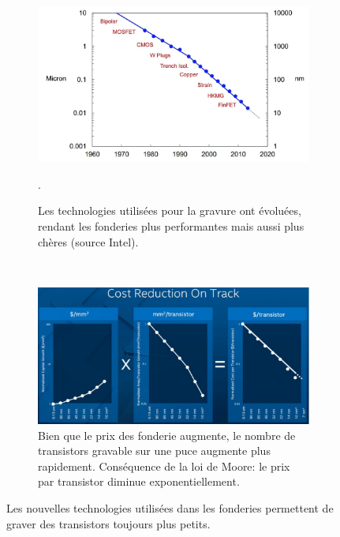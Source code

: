 \begin{figure}[htbp]
    \centering
    \begin{subfigure}[b]{0.40\linewidth}\centering
        \includegraphics[width=\linewidth]{images/processeurs_porte_fondeurs.png}
        \caption{\label{processeurs_porte_fondeurs} Les technologies utilisées pour la gravure ont évoluées, rendant les fonderies plus performantes mais aussi plus chères (source Intel).}.
    \end{subfigure}
    ~ %
    \begin{subfigure}[b]{0.50\linewidth}\centering
        \includegraphics[width=\linewidth]{images/processeurs_porte_moore.png}
        \caption{\label{pic_Moore_explique} Bien que le prix des fonderie augmente, le nombre de transistors gravable sur une puce augmente plus rapidement. Conséquence de la loi de Moore: le prix par transistor diminue exponentiellement.}
    \end{subfigure}
    \caption{Les nouvelles technologies utilisées dans les fonderies permettent de graver des transistors toujours plus petits.}\label{pic_fonderie}
\end{figure}










